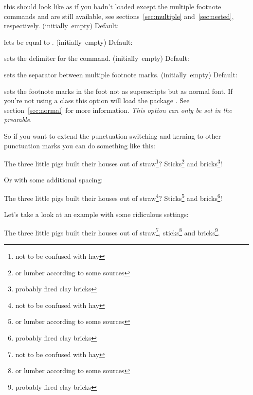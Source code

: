 \documentclass[toc=index,toc=bib]{cnpkgdoc}
\newcommand*\Default[1]{%
  \hfill\llap
    {%
      \ifblank{#1}%
        {(initially~empty)}%
        {Default:~\code{#1}}%
    }%
  \newline
}
\begin{document}
\begin{beschreibung}
   this should look like as if you hadn't loaded \fnpct except the multiple
   footnote commands and  are still available, see
   sections~\ref{sec:multiple} and~\ref{sec:nested}, respectively.
 \Default{false}
   lets  be equal to .
 \Default{;}
   sets the delimiter for the  command.
 \Default{,}
   sets the separator between multiple footnote marks.
 \Default{false}
   sets the footnote marks in the foot not as superscripts but as normal font. If
   you're not using a  class this option will load
   the package . See section~\ref{sec:normal} for more information.
   \emph{This option can only be set in the preamble}.
\end{beschreibung}

So if you want to extend the punctuation switching and kerning to other punctuation
marks you can do something like this:
\begin{beispiel}
 \begin{minipage}{.4\linewidth}
  \noindent The three little pigs built their houses
  out of straw\footnote{not to be confused with hay}?
  Sticks\footnote{or lumber according to some sources}
  and bricks\footnote{probably fired clay bricks}!
 \end{minipage}
\end{beispiel}

Or with some additional spacing:
\begin{beispiel}
 \begin{minipage}{.4\linewidth}
  \noindent The three little pigs built their houses
  out of straw\footnote{not to be confused with hay}?
  Sticks\footnote{or lumber according to some sources}
  and bricks\footnote{probably fired clay bricks}!
 \end{minipage}
\end{beispiel}

Let's take a look at an example with some ridiculous settings:
\begin{beispiel}
 \begin{minipage}{.4\linewidth}
  \noindent The three little pigs built their houses
  out of straw\footnote{not to be confused with hay},
  sticks\footnote{or lumber according to some sources}
  and bricks\footnote{probably fired clay bricks}.
 \end{minipage}
\end{beispiel}
\end{document}
